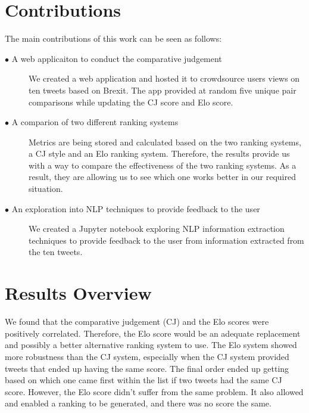 	\section{Contributions} 
		\label{sec:intro_contribs} 

		The main contributions of this work can be seen as follows:

		\begin{description}	

			\item[\(\bullet\) A web applicaiton to conduct the comparative judgement]\hfill

			We created a web application and hosted it to crowdsource users views on ten tweets based on Brexit. The app provided at random five unique pair comparisons while updating the CJ score and Elo score. 

			\item[\(\bullet\) A comparion of two different ranking systems]\hfill

			Metrics are being stored and calculated based on the two ranking systems, a CJ style and an Elo ranking system. Therefore, the results provide us with a way to compare the effectiveness of the two ranking systems. As a result, they are allowing us to see which one works better in our required situation.

			\item[\(\bullet\) An exploration into NLP techniques to provide feedback to the user]\hfill

		We created a Jupyter notebook exploring NLP information extraction techniques to provide feedback to the user from information extracted from the ten tweets.

		\end{description}
	
	\section{Results Overview}
		We found that the comparative judgement (CJ) and the Elo scores were positively correlated. Therefore, the Elo score would be an adequate replacement and possibly a better alternative ranking system to use. The Elo system showed more robustness than the CJ system, especially when the CJ system provided tweets that ended up having the same score. The final order ended up getting based on which one came first within the list if two tweets had the same CJ score. However, the Elo score didn't suffer from the same problem. It also allowed and enabled a ranking to be generated, and there was no score the same.
		
